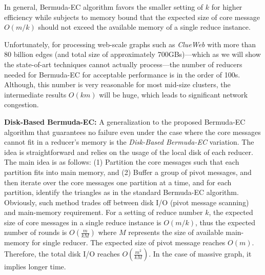 In general, Bermuda-EC algorithm favors the smaller setting of $k$ for higher efficiency while subjects to memory bound that the 
expected size of core message $O(m/k)$ should not exceed the available memory of a single reduce instance. 

Unfortunately, for processing web-scale graphs such as \emph{ClueWeb} with more than 80 billion edges (and total size of approximately 700GBs)---which as we will show the state-of-art techniques cannot actually process---the number of reducers needed  for Bermuda-EC for acceptable performance is in the order of 100s. 
Although, this number is very reasonable for most mid-size clusters, the intermediate results $O(km)$ will be huge, which leads to significant network congestion.  

\textbf{Disk-Based Bermuda-EC:} A generalization to the proposed Bermuda-EC algorithm that guarantees 
no failure even under the case where  the core messages cannot fit in a reducer's memory is the {\em Disk-Based Bermuda-EC} variation. 
The idea is straightforward and relies on the usage of the local disk of each reducer. 
The main idea is as follows: (1) Partition the core messages such that each partition fits into main memory,
 and (2) Buffer a group of pivot messages, and then iterate over the core messages one partition at a time, and for each partition, identify the triangles as in the standard Bermuda-EC algorithm. 
 Obviously, such method trades off between disk I/O (pivot message scanning) and main-memory requirement. For a setting of reduce number $k$, the expected size of core messages in a single reduce instance is $O(m/k)$, thus the expected number of rounds is $O(\frac{m}{kM})$ where $M$ represents the size of available main-memory for single reducer. The expected size of pivot message reaches $O(m)$. Therefore, the total disk I/O reaches $O(\frac{m^2}{kM})$. In the case of massive graph, it implies longer time. 
